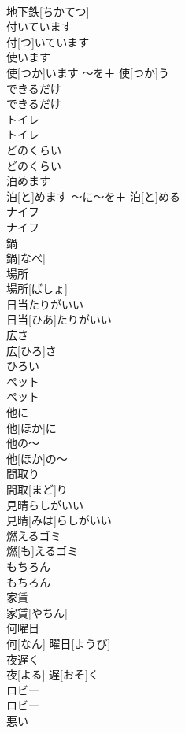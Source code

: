 \documentclass[8pt]{extreport}
\begin{document}
\begin{CJK}{UTF8}{min}
\\	地下鉄[ちかてつ]		
\\	付いています	
\\	付[つ]いています		
\\	使います	
\\	使[つか]います	〜を＋ 使[つか]う	
\\	できるだけ	
\\	できるだけ		
\\	トイレ	
\\	トイレ		
\\	どのくらい	
\\	どのくらい		
\\	泊めます	
\\	泊[と]めます	〜に〜を＋ 泊[と]める	
\\	ナイフ	
\\	ナイフ		
\\	鍋	
\\	鍋[なべ]		
\\	場所	
\\	場所[ばしょ]		
\\	日当たりがいい	
\\	日当[ひあ]たりがいい		
\\	広さ	
\\	広[ひろ]さ	
\\	ひろい 
\\	ペット	
\\	ペット		
\\	他に	
\\	他[ほか]に		
\\	他の〜	
\\	他[ほか]の〜		
\\	間取り	
\\	間取[まど]り		
\\	見晴らしがいい	
\\	見晴[みは]らしがいい		
\\	燃えるゴミ	
\\	燃[も]えるゴミ		
\\	もちろん	
\\	もちろん		
\\	家賃	
\\	家賃[やちん]		
\\	何曜日	
\\	何[なん] 曜日[ようび]		
\\	夜遅く	
\\	夜[よる] 遅[おそ]く		
\\	ロビー	
\\	ロビー		
\\	悪い	

\end{CJK}
\end{document}
